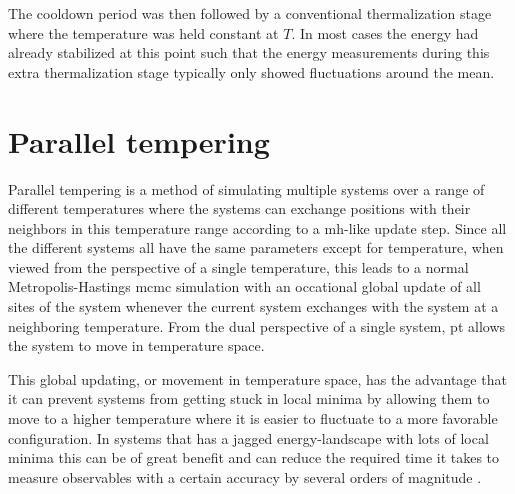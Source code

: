 The cooldown period was then followed by a conventional thermalization stage where the temperature was held constant at $T$. In
most cases the energy had already stabilized at this point such that the energy measurements during this extra thermalization
stage typically only showed fluctuations around the mean.


\section{Parallel tempering}

Parallel tempering is a method of simulating multiple systems over a range of different temperatures where the systems can exchange
positions with their neighbors in this temperature range according to a \ac{mh}-like update step. Since all the different systems all have the same parameters
except for temperature, when viewed from the perspective of a single temperature, this leads to a normal Metropolis-Hastings \ac{mcmc}
simulation with an occational global update of all sites of the system whenever the current system exchanges with the system at a neighboring
temperature. From the dual perspective of a single system, \ac{pt} allows the system to move in temperature space.

This global updating, or movement in temperature space, has the advantage that it can prevent systems from getting stuck in local minima
by allowing them to move to a higher temperature where it is easier to fluctuate to a more favorable configuration. In systems that
has a jagged energy-landscape with lots of local minima this can be of great benefit and can reduce the required time it takes
to measure observables with a certain accuracy by several orders of magnitude \cite{Katzgraber09}.

